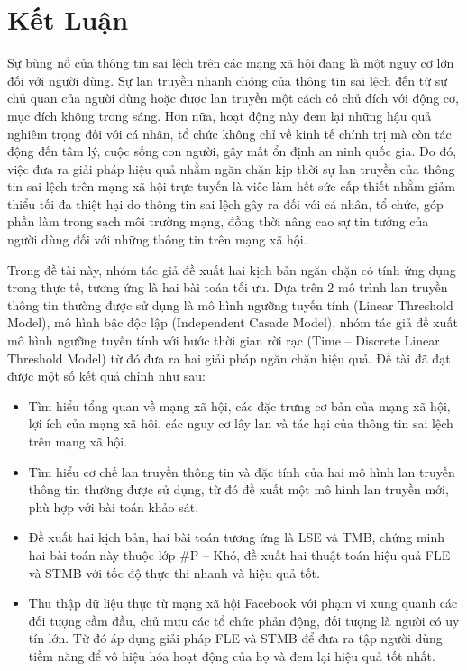 \chapter*{Kết Luận}
Sự bùng nổ của thông tin sai lệch trên các mạng xã hội đang là một nguy cơ lớn đối với người dùng. Sự lan truyền nhanh chóng của thông tin sai lệch đến từ sự chủ quan của người dùng hoặc được lan truyền một cách có chủ đích với động cơ, mục đích không trong sáng. Hơn nữa, hoạt động này đem lại những hậu quả nghiêm trọng đối với cá nhân, tổ chức không chỉ về kinh tế chính trị mà còn tác động đến tâm lý, cuộc sống con người, gây mất ổn định an ninh quốc gia. Do đó, việc đưa ra giải pháp hiệu quả nhằm ngăn chặn kịp thời sự lan truyền của thông tin sai lệch trên mạng xã hội trực tuyến là viêc làm hết sức cấp thiết nhằm giảm thiểu tối đa thiệt hại do thông tin sai lệch gây ra đối với cá nhân, tổ chức, góp phần làm trong sạch môi trường mạng, đồng thời nâng cao sự tin tưởng của người dùng đối với những thông tin trên mạng xã hội.

Trong đề tài này, nhóm tác giả đề xuất hai kịch bản ngăn chặn có tính ứng dụng trong thực tế, tương ứng là hai bài toán tối ưu. Dựa trên 2 mô trình lan truyền thông tin thường được sử dụng là mô hình ngưỡng tuyến tính (Linear Threshold Model), mô hình bậc độc lập (Independent Casade Model), nhóm tác giả đề xuất mô hình ngưỡng tuyến tính với bước thời gian rời rạc (Time – Discrete Linear Threshold Model) từ đó đưa ra hai giải pháp ngăn chặn hiệu quả. Đề tài đã đạt được một số kết quả chính như sau:

\begin{itemize}
	\item Tìm hiểu tổng quan về mạng xã hội, các đặc trưng cơ bản của mạng xã hội, lợi ích của mạng xã hội, các nguy cơ lây lan và tác hại của thông tin sai lệch trên mạng xã hội.
	
	\item Tìm hiểu cơ chế lan truyền thông tin và đặc tính của hai mô hình lan truyền thông tin thường được sử dụng, từ đó đề xuất một mô hình lan truyền mới, phù hợp với bài toán khảo sát.
	
	\item Đề xuất hai kịch bản, hai bài toán tương ứng là LSE và TMB, chứng minh hai bài toán này thuộc lớp \#P – Khó, đề xuất hai thuật toán hiệu quả FLE và STMB với tốc độ thực thi nhanh và hiệu quả tốt.
	
	\item Thu thập dữ liệu thực từ mạng xã hội Facebook với phạm vi xung quanh các đối tượng cầm đầu, chủ mưu các tổ chức phản động, đối tượng là người có uy tín lớn. Từ đó áp dụng giải pháp FLE và STMB để đưa ra tập người dùng tiềm năng để vô hiệu hóa hoạt động của họ và đem lại hiệu quả tốt nhất.
	
\end{itemize}

